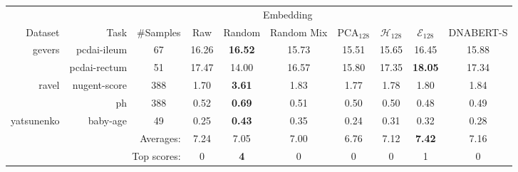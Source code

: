 \begin{tabular}{rrcccccccc}
\toprule
& & \multicolumn{7}{c}{Embedding} \\
Dataset& Task& \#Samples& Raw& Random & Random Mix &  PCA$_{128}$& $\mathcal{H}_{128}$& $\mathcal{E}_{128}$& DNABERT-S\\
\midrule
\multirow{2}{*}{gevers}
& pcdai-ileum & 67 & 16.26 & \textbf{16.52} & 15.73 & 15.51 & 15.65 & 16.45 & 15.88 \\
& pcdai-rectum & 51 & 17.47 & 14.00 & 16.57 & 15.80 & 17.35 & \textbf{18.05} & 17.34 \\
\midrule
\multirow{2}{*}{ravel}
& nugent-score & 388 & 1.70 & \textbf{3.61} & 1.83 & 1.77 & 1.78 & 1.80 & 1.84 \\
& ph & 388 & 0.52 & \textbf{0.69} & 0.51 & 0.50 & 0.50 & 0.48 & 0.49 \\
\midrule
\multirow{1}{*}{yatsunenko}
& baby-age & 49 & 0.25 & \textbf{0.43} & 0.35 & 0.24 & 0.31 & 0.32 & 0.28 \\
\midrule
\multicolumn{3}{r}{Averages:} & 7.24& 7.05& 7.00& 6.76& 7.12& \textbf{7.42}& 7.16\\
\multicolumn{3}{r}{Top scores:} & 0& \textbf{4}& 0& 0& 0& 1& 0\\
\bottomrule
\end{tabular}